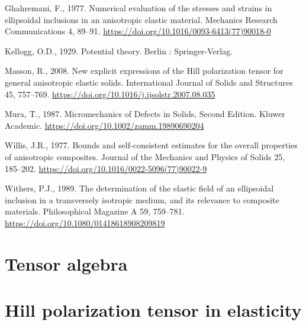 \documentclass[
  letterpaper,
  DIV=11,
  numbers=noendperiod]{scrreprt}
\newlength{\cslhangindent}
\newlength{\cslentryspacingunit} %
\newenvironment{CSLReferences}[2] %
 {%
  \setlength{\parindent}{0pt}
  \ifodd #1
  \let\oldpar\par
  \def\par{\hangindent=\cslhangindent\oldpar}
  \fi
  \setlength{\parskip}{#2\cslentryspacingunit}
 }%
 {}
\begin{document}
\begin{CSLReferences}{1}{0}
\leavevmode{}%
Ghahremani, F., 1977. Numerical evaluation of the stresses and strains
in ellipsoidal inclusions in an anisotropic elastic material. Mechanics
Research Communications 4, 89--91.
\url{https://doi.org/10.1016/0093-6413(77)90018-0}

\leavevmode{}%
Kellogg, O.D., 1929. Potential theory. {Berlin : Springer-Verlag}.

\leavevmode{}%
Masson, R., 2008. New explicit expressions of the {Hill} polarization
tensor for general anisotropic elastic solids. International Journal of
Solids and Structures 45, 757--769.
\url{https://doi.org/10.1016/j.ijsolstr.2007.08.035}

\leavevmode{}%
Mura, T., 1987. Micromechanics of {Defects} in {Solids}, {Second
Edition}. {Kluwer Academic}.
\url{https://doi.org/10.1002/zamm.19890690204}

\leavevmode{}%
Willis, J.R., 1977. Bounds and self-consistent estimates for the overall
properties of anisotropic composites. Journal of the Mechanics and
Physics of Solids 25, 185--202.
\url{https://doi.org/10.1016/0022-5096(77)90022-9}

\leavevmode{}%
Withers, P.J., 1989. The determination of the elastic field of an
ellipsoidal inclusion in a transversely isotropic medium, and its
relevance to composite materials. Philosophical Magazine A 59, 759--781.
\url{https://doi.org/10.1080/01418618908209819}

\end{CSLReferences}

\appendix
{}

\hypertarget{sec-tensor_algebra}{%
\chapter{Tensor algebra}\label{sec-tensor_algebra}}

\hypertarget{sec-hill_elas}{%
\chapter{Hill polarization tensor in elasticity}\label{sec-hill_elas}}
\end{document}
